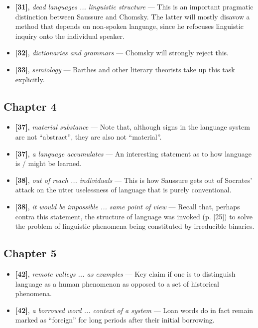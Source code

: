 \documentclass[12pt]{article}
\begin{document}
\begin{itemize}
\item \textbf{[31]}, \textit{dead languages ... linguistic structure} --- This is an important pragmatic distinction between Saussure and Chomsky. The latter will mostly disavow a method that depends on non-spoken language, since he refocuses linguistic inquiry onto the individual speaker.

\item \textbf{[32]}, \textit{dictionaries and grammars} --- Chomsky will strongly reject this.

\item \textbf{[33]}, \textit{semiology} --- Barthes and other literary theorists take up this task explicitly.

\end{itemize}

\subsection{Chapter 4}

\begin{itemize}

\item \textbf{[37]}, \textit{material substance} --- Note that, although signs in the language system are not ``abstract'', they are also not ``material''.

\item \textbf{[37]}, \textit{a language accumulates} --- An interesting statement as to how  language is / might be learned.

\item \textbf{[38]}, \textit{out of reach ... individuals} --- This is how Saussure gets out of Socrates' attack on the utter uselessness of language that is purely conventional.

\item \textbf{[38]}, \textit{it would be impossible ... same point of view} --- Recall that, perhaps contra this statement, the structure of language was invoked (p. [25]) to solve the problem of linguistic phenomena being constituted by irreducible binaries. 

\end{itemize}

\subsection{Chapter 5}

\begin{itemize}

\item \textbf{[42]}, \textit{remote valleys ... as examples} --- Key claim if one is to distinguish language as a human phenomenon as opposed to a set of historical phenomena.

\item \textbf{[42]}, \textit{a borrowed word ... context of a system} --- Loan words do in fact remain marked as ``foreign'' for long periods after their initial borrowing.

\end{itemize}
\end{document}
